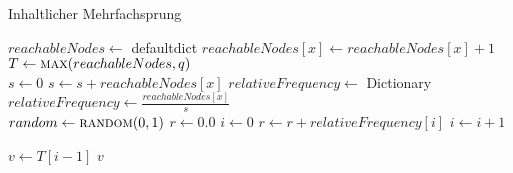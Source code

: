 \begin{algorithm}
  \caption{Inhaltlicher Mehrfachsprung}
  \label{alg:DYCOS-content-multihop}
    \begin{algorithmic}[1]
            \State $reachableNodes \gets$ defaultdict\label{alg:l2}
                    \State $reachableNodes[x] \gets reachableNodes[x] + 1$
                \EndFor
            \EndFor\label{alg:l5}
            \State \label{alg:l6} $T \gets \Call{max}{reachableNodes, q}$
            \\
            \State \label{alg:l8} $s \gets 0$
                \State $s \gets s + reachableNodes[x]$
            \EndFor
            \State $relativeFrequency \gets $ Dictionary
                \State $relativeFrequency \gets \frac{reachableNodes[x]}{s}$
            \EndFor\label{alg:l13} 
            \\
            \State \label{alg:15} $random \gets \Call{random}{0, 1}$
            \State $r \gets 0.0$
            \State $i \gets 0$
                \State $r \gets r + relativeFrequency[i]$
                \State $i \gets i + 1$
            \EndWhile
            
            \State $v \gets T[i-1]$ \label{alg:21}
            \State \Return $v$ \label{alg:22} 
        \EndProcedure
    \end{algorithmic}
\end{algorithm}
